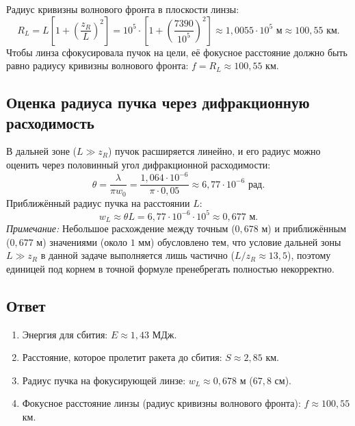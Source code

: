 \documentclass[12pt, a4paper]{article}
\begin{document}
Радиус кривизны волнового фронта в плоскости линзы:
\[
R_L = L \left[ 1 + \left(\frac{z_R}{L}\right)^2 \right] = 10^5 \cdot \left[ 1 + \left(\frac{7390}{10^5}\right)^2 \right] \approx 1{,}0055 \cdot 10^5 \text{ м} \approx 100{,}55 \text{ км}.
\]
Чтобы линза сфокусировала пучок на цели, её фокусное расстояние должно быть равно радиусу кривизны волнового фронта: $f = R_L \approx 100{,}55$ км.

\subsection*{Оценка радиуса пучка через дифракционную расходимость}
В дальней зоне ($L \gg z_R$) пучок расширяется линейно, и его радиус можно оценить через половинный угол дифракционной расходимости:
\[
\theta = \frac{\lambda}{\pi w_0} = \frac{1{,}064 \cdot 10^{-6}}{\pi \cdot 0{,}05} \approx 6{,}77 \cdot 10^{-6} \text{ рад}.
\]
Приближённый радиус пучка на расстоянии $L$:
\[
w_L \approx \theta L = 6{,}77 \cdot 10^{-6} \cdot 10^5 \approx 0{,}677 \text{ м}.
\]
\textit{Примечание:} Небольшое расхождение между точным ($0{,}678$ м) и приближённым ($0{,}677$ м) значениями (около $1$ мм) обусловлено тем, что условие дальней зоны $L \gg z_R$ в данной задаче выполняется лишь частично ($L/z_R \approx 13{,}5$), поэтому единицей под корнем в точной формуле пренебрегать полностью некорректно.

\subsection*{Ответ}
\begin{enumerate}
    \item Энергия для сбития: $E \approx 1{,}43$ МДж.
    \item Расстояние, которое пролетит ракета до сбития: $S \approx 2{,}85$ км.
    \item Радиус пучка на фокусирующей линзе: $w_L \approx 0{,}678$ м ($67{,}8$ см).
    \item Фокусное расстояние линзы (радиус кривизны волнового фронта): $f \approx 100{,}55$ км.
\end{enumerate}
\end{document}

